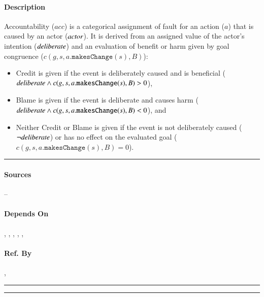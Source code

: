 \paragraph{Description} Accountability ($acc$) is a categorical assignment of
fault for an action ($a$) that is caused by an actor ($\mathit{actor}$). It is derived
from an assigned value of the actor's intention ($\mathit{deliberate}$) and an
evaluation of benefit or harm given by goal congruence ($c(g, s,
a.\mathtt{makesChange}(s), B)$):
\begin{itemize}
    \item Credit is given if the event is deliberately caused and is beneficial
    ($\mathit{deliberate} \wedge c(g, s, a.\mathtt{makesChange}(s), B) > 0$),

    \item Blame is given if the event is deliberate and causes harm
    ($\mathit{deliberate} \wedge c(g, s, a.\mathtt{makesChange}(s), B) < 0$), and

    \item Neither Credit or Blame is given if the event is not deliberately
    caused ($\neg \mathit{deliberate}$) or has no effect on the evaluated goal ($c(g,
    s, a.\mathtt{makesChange}(s), B) = 0$).
\end{itemize}
\hrule

\paragraph{Sources} --

\paragraph{Depends On} , , 
, , , 

\paragraph{Ref. By} , 
\\\hrule\vspace{0.5mm}\hrule

~\newline

